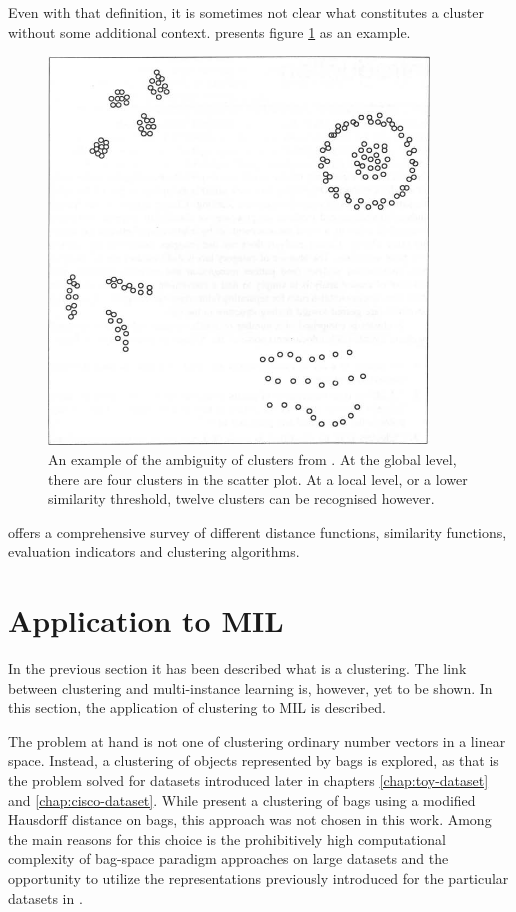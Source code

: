 Even with that definition, it is sometimes not clear what constitutes a cluster without some additional context. \cite{jain_algorithms_1988} presents figure \ref{fig:cluster-ambiguity} as an example.

\begin{figure}[h]
	\centering
	\includegraphics[width=0.9\textwidth]{images/cluster-ambiguity.png}
	\caption{An example of the ambiguity of clusters from \cite{jain_algorithms_1988}. At the global level, there are four clusters in the scatter plot. At a local level, or a lower similarity threshold, twelve clusters can be recognised however.}\label{fig:cluster-ambiguity}
\end{figure}

\cite{xu_comprehensive_2015} offers a comprehensive survey of different distance functions, similarity functions, evaluation indicators and clustering algorithms.

\section{Application to MIL}\label{sec:mil-clustering}

In the previous section it has been described what is a clustering. The link between clustering and multi-instance learning is, however, yet to be shown. In this section, the application of clustering to MIL is described.

The problem at hand is not one of clustering ordinary number vectors in a linear space. Instead, a clustering of objects represented by bags is explored, as that is the problem solved for datasets introduced later in chapters \ref{chap:toy-dataset} and \ref{chap:cisco-dataset}. While \cite{wang_solving_2000} present a clustering of bags using a modified Hausdorff distance on bags, this approach was not chosen in this work. Among the main reasons for this choice is the prohibitively high computational complexity of bag-space paradigm approaches on large datasets and the opportunity to utilize the representations previously introduced for the particular datasets in \cite{dedic_hierarchicke_2017}.

